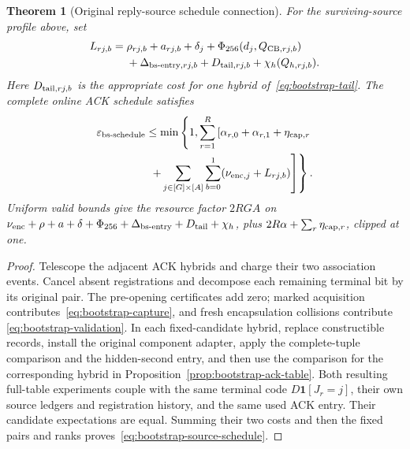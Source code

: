 \documentclass[pdflatex]{sn-jnl}
\theoremstyle{thmstyleone}
\newtheorem{theorem}{Theorem}[section]
\theoremstyle{thmstylethree}
\theoremstyle{thmstyletwo}
\begin{document}
\begin{theorem}[Original reply-source schedule connection]
\label{thm:bootstrap-source-schedule}
For the surviving-source profile above, set
\[
 \begin{split}
 L_{rj,b}={}&\rho_{rj,b}+a_{rj,b}+\delta_j
       +\Phi_{256}(d_j,Q_{{\rm CB},rj,b})\\
       &+\Delta_{{\rm bs\text{-}entry},rj,b}
        +D_{{\rm tail},rj,b}+\chi_h(Q_{h,rj,b}).
 \end{split}
\]
Here $D_{{\rm tail},rj,b}$ is the appropriate cost for one hybrid
of~\eqref{eq:bootstrap-tail}. The complete online ACK schedule satisfies
\begin{equation}
 \begin{split}
 \varepsilon_{\rm bs\text{-}schedule}\le\min\left\{1,
 \sum_{r=1}^{R}\left[
       \alpha_{r,0}+\alpha_{r,1}+\eta_{{\rm cap},r}\right.\right.\\
 \left.\left.\hspace{16mm}
       +\sum_{j\in[G]\times[A]}\sum_{b=0}^{1}
              (\nu_{{\rm enc},j}+L_{rj,b})\right]\right\}.
 \end{split}
 \label{eq:bootstrap-source-schedule}
\end{equation}
Uniform valid bounds give the resource factor $2RGA$ on
$\nu_{\rm enc}+\rho+a+\delta+\Phi_{256}
 +\Delta_{\rm bs\text{-}entry}+D_{\rm tail}+\chi_h$,
plus $2R\alpha+\sum_r\eta_{{\rm cap},r}$, clipped at one.
\end{theorem}
\begin{proof}
Telescope the adjacent ACK hybrids and charge their two association
events. Cancel absent registrations and decompose each remaining
terminal bit by its original pair. The pre-opening certificates add
zero; marked acquisition contributes~\eqref{eq:bootstrap-capture},
and fresh encapsulation collisions contribute
\eqref{eq:bootstrap-validation}. In each fixed-candidate hybrid,
replace constructible records, install the original component adapter,
apply the complete-tuple comparison and the hidden-second entry, and
then use the comparison for the corresponding hybrid in
Proposition~\ref{prop:bootstrap-ack-table}.
Both resulting full-table experiments couple with the same terminal
code $D\mathbf1[J_r=j]$, their own source ledgers and registration
history, and the same used ACK entry. Their candidate expectations
are equal. Summing their two costs and then the fixed pairs and ranks
proves~\eqref{eq:bootstrap-source-schedule}.
\end{proof}
\end{document}
